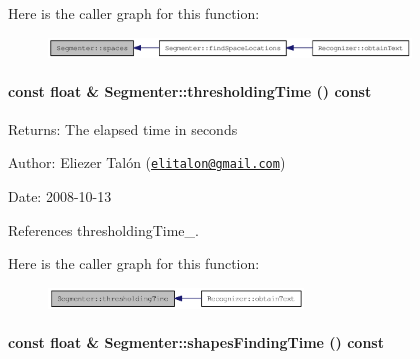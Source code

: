 Here is the caller graph for this function:\nopagebreak
\begin{figure}[H]
\begin{center}
\leavevmode
\includegraphics[width=273pt]{class_segmenter_eed49de2d6548ae8016bf6c9c78cec99_icgraph}
\end{center}
\end{figure}
\hypertarget{class_segmenter_9114d0f3934b43478fb55077b7722d3d}{
\paragraph[thresholdingTime]{\setlength{\rightskip}{0pt plus 5cm}const float \& Segmenter::thresholdingTime () const}\hfill}
\label{class_segmenter_9114d0f3934b43478fb55077b7722d3d}


\begin{Desc}
\item[Returns:]The elapsed time in seconds\end{Desc}
\begin{Desc}
\item[Author:]Eliezer Talón (\href{mailto:elitalon@gmail.com}{\tt elitalon@gmail.com}) \end{Desc}
\begin{Desc}
\item[Date:]2008-10-13 \end{Desc}


References thresholdingTime\_\-.

Here is the caller graph for this function:\nopagebreak
\begin{figure}[H]
\begin{center}
\leavevmode
\includegraphics[width=192pt]{class_segmenter_9114d0f3934b43478fb55077b7722d3d_icgraph}
\end{center}
\end{figure}
\hypertarget{class_segmenter_8d7304b35b1891b1c7154a3ac2ff2c4b}{
\paragraph[shapesFindingTime]{\setlength{\rightskip}{0pt plus 5cm}const float \& Segmenter::shapesFindingTime () const}\hfill}
\label{class_segmenter_8d7304b35b1891b1c7154a3ac2ff2c4b}


